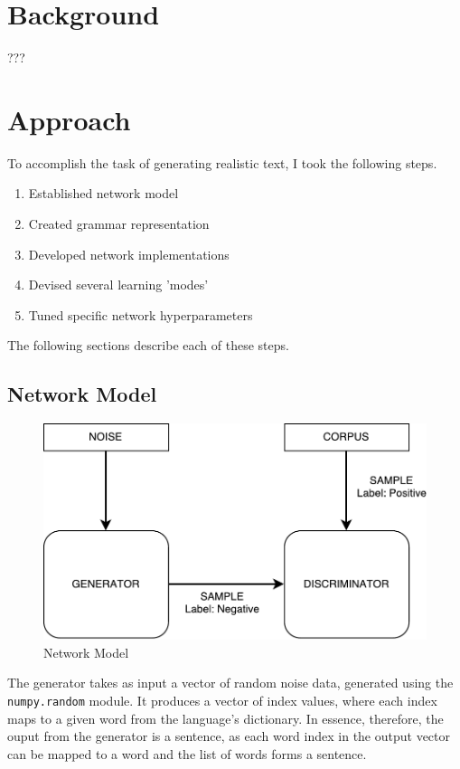 \documentclass[12pt]{article}
\begin{document}
\section{Background}
    ???

\section{Approach}

To accomplish the task of generating realistic text, I took the following steps.

\begin{enumerate}
    \item Established network model
    \item Created grammar representation
    \item Developed network implementations
    \item Devised several learning 'modes'
    \item Tuned specific network hyperparameters
\end{enumerate}

The following sections describe each of these steps.

\subsection{Network Model}

\begin{figure}[ht]
    \centering
    \includegraphics[scale=0.5]{img/network_model.pdf}
    \caption{Network Model}
    \label{fig:net_model}
\end{figure}

The generator takes as input a vector of random noise data, generated using the \texttt{numpy.random} module. It produces a vector of index values, where each index maps to a given word from the language's dictionary. In essence, therefore, the ouput from the generator is a sentence, as each word index in the output vector can be mapped to a word and the list of words forms a sentence.
\end{document}
